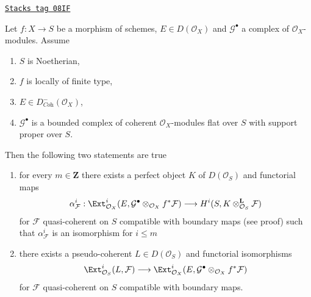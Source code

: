 \begin{lemma}
\label{perfect-lemma-compute-ext}
\href{https://stacks.math.columbia.edu/tag/08IF}{\texttt{Stacks tag 08IF}}

Let $f : X \to S$ be a morphism of schemes, $E \in D(\mathcal{O}_X)$
and $\mathcal{G}^\bullet$ a complex of $\mathcal{O}_X$-modules.
Assume
\begin{enumerate}
\item $S$ is Noetherian,
\item $f$ is locally of finite type,
\item $E \in D^-_{\textit{Coh}}(\mathcal{O}_X)$,
\item $\mathcal{G}^\bullet$ is a bounded complex of
coherent $\mathcal{O}_X$-modules flat over $S$ with support proper over $S$.
\end{enumerate}
Then the following two statements are true
\begin{enumerate}
\item[(A)] for every $m \in \mathbf{Z}$ there exists a perfect object $K$
of $D(\mathcal{O}_S)$ and functorial maps
$$
\alpha^i_\mathcal{F} :
\Ext^i_{\mathcal{O}_X}(E,
\mathcal{G}^\bullet \otimes_{\mathcal{O}_X} f^*\mathcal{F})
\longrightarrow
H^i(S, K \otimes^\mathbf{L}_{\mathcal{O}_S} \mathcal{F})
$$
for $\mathcal{F}$ quasi-coherent on $S$ compatible with boundary maps
(see proof) such that $\alpha^i_\mathcal{F}$ is an isomorphism for $i \leq m$
\item[(B)] there exists a pseudo-coherent $L \in D(\mathcal{O}_S)$
and functorial isomorphisms
$$
\Ext^i_{\mathcal{O}_S}(L, \mathcal{F}) \longrightarrow
\Ext^i_{\mathcal{O}_X}(E,
\mathcal{G}^\bullet \otimes_{\mathcal{O}_X} f^*\mathcal{F})
$$
for $\mathcal{F}$ quasi-coherent on $S$ compatible with boundary maps.
\end{enumerate}
\end{lemma}

